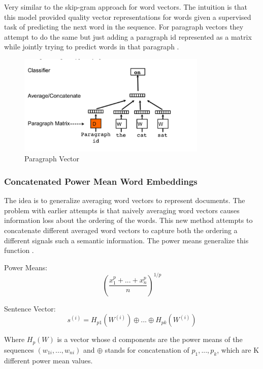 \documentclass[12pt]{article}
\begin{document}
Very similar to the skip-gram approach for word vectors. The intuition is that this model provided quality vector representations for words given a supervised task of predicting the next word in the sequence. For paragraph vectors they attempt to do the same but just adding a paragraph id represented as a matrix while jointly trying to predict words in that paragraph \cite{Le:2014:DRS:3044805.3045025}. 

\begin{figure}[ht!]
\center
\includegraphics[width=90mm]{paragraph.png}
    \caption{Paragraph Vector}
    \label{paragraph vector}
\end{figure}

\subsubsection{Concatenated Power Mean Word Embeddings}

The idea is to generalize averaging word vectors to represent documents. The problem with earlier attempts is that naively averaging word vectors causes information loss about the ordering of the words. This new method attempts to concatenate different averaged word vectors to capture both the ordering a different signals such a semantic information. The power means generalize this function \cite{DBLP:journals/corr/abs-1803-01400}. 

Power Means: 
\begin{equation}
    (\frac{x_1^p + ... + x_n^p}{n})^{1/p}
\end{equation}

Sentence Vector:
\begin{equation}
    s^{(i)} = H_{p1}(W^{(i)}) \oplus ...  \oplus H_{pk}(W^{(i)})
\end{equation}

Where $H_p(W)$ is a vector whose d components are the power means of the sequences $(w_{1i} , ... , w_{ni}) $ and $\oplus$ stands for concatenation of $p_1 , ... , p_k$, which are K different power mean values.
\end{document}
